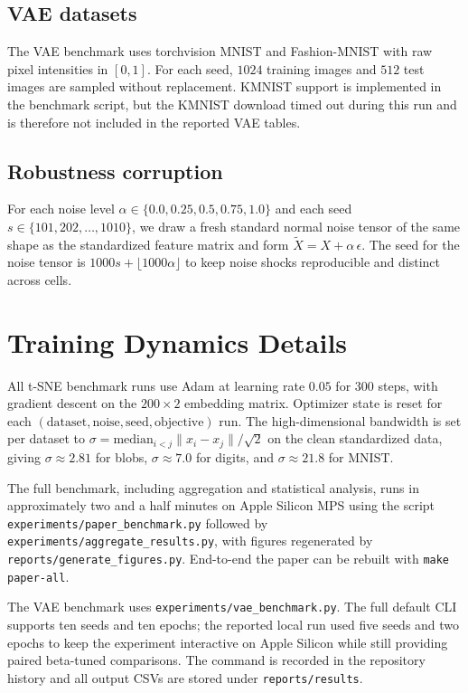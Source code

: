 \documentclass[11pt]{article}
\begin{document}
\subsection{VAE datasets}
The VAE benchmark uses torchvision MNIST and Fashion-MNIST with raw pixel intensities in
$[0,1]$. For each seed, $1024$ training images and $512$ test images are sampled without
replacement. KMNIST support is implemented in the benchmark script, but the KMNIST download
timed out during this run and is therefore not included in the reported VAE tables.

\subsection{Robustness corruption}
For each noise level $\alpha\in\{0.0, 0.25, 0.5, 0.75, 1.0\}$ and each seed
$s\in\{101,202,\ldots,1010\}$, we draw a fresh standard normal noise tensor of the same shape
as the standardized feature matrix and form $\widetilde{X}=X+\alpha\,\epsilon$. The seed for
the noise tensor is $1000s + \lfloor 1000\alpha\rfloor$ to keep noise shocks reproducible and
distinct across cells.

\section{Training Dynamics Details}
\label{app:dynamics}

All t-SNE benchmark runs use Adam at learning rate $0.05$ for $300$ steps, with gradient
descent on the $200\times 2$ embedding matrix. Optimizer state is reset for each
$(\text{dataset},\text{noise},\text{seed},\text{objective})$ run. The high-dimensional
bandwidth is set per dataset to $\sigma=\mathrm{median}_{i<j}\|x_i-x_j\|/\sqrt{2}$ on the
clean standardized data, giving $\sigma\approx2.81$ for blobs, $\sigma\approx7.0$ for digits,
and $\sigma\approx21.8$ for MNIST.

The full benchmark, including aggregation and statistical analysis, runs in approximately
two and a half minutes on Apple Silicon MPS using the script
\texttt{experiments/paper\_benchmark.py} followed by
\texttt{experiments/aggregate\_results.py}, with figures regenerated by
\texttt{reports/generate\_figures.py}. End-to-end the paper can be rebuilt with
\texttt{make paper-all}.

The VAE benchmark uses \texttt{experiments/vae\_benchmark.py}. The full default CLI supports
ten seeds and ten epochs; the reported local run used five seeds and two epochs to keep the
experiment interactive on Apple Silicon while still providing paired beta-tuned comparisons.
The command is recorded in the repository history and all output CSVs are stored under
\texttt{reports/results}.



\end{document}
